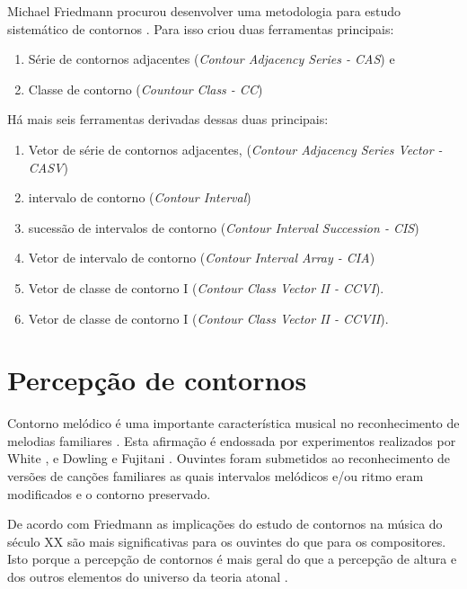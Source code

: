\documentclass[12pt,brazil]{book}
\newcommand{\eng}[1]{\textit{#1}}
\begin{document}
Michael Friedmann procurou desenvolver uma metodologia para estudo
sistemático de contornos \cite{friedmann85:methodology}. Para isso
criou duas ferramentas principais:

\begin{enumerate}
\item Série de contornos adjacentes (\eng{Contour Adjacency Series -
    CAS}) e
\item Classe de contorno (\eng{Countour Class - CC})
\end{enumerate}

Há mais seis ferramentas derivadas dessas duas principais:

\begin{enumerate}
\item Vetor de série de contornos adjacentes, (\eng{Contour Adjacency
    Series Vector - CASV})
\item intervalo de contorno (\eng{Contour Interval})
\item sucessão de intervalos de contorno (\eng{Contour Interval
    Succession - CIS})
\item Vetor de intervalo de contorno (\eng{Contour Interval Array -
    CIA})
\item Vetor de classe de contorno I (\eng{Contour Class Vector II -
    CCVI}).
\item Vetor de classe de contorno I (\eng{Contour Class Vector II -
    CCVII}).
\end{enumerate}

\section{Percepção de contornos}
\label{sec:perc-de-cont}

Contorno melódico é uma importante característica musical no
reconhecimento de melodias familiares
\cite[p. 136]{dowling.ea86:music}. Esta afirmação é endossada por
experimentos realizados por White \cite{white60:recognition}, e
Dowling e Fujitani \cite{dowling.ea71:contour}. Ouvintes foram
submetidos ao reconhecimento de versões de canções familiares as quais
intervalos melódicos e/ou ritmo eram modificados e o contorno
preservado.

De acordo com Friedmann as implicações do estudo de contornos na
música do século XX são mais significativas para os ouvintes do que
para os compositores. Isto porque a percepção de contornos é mais
geral do que a percepção de altura e dos outros elementos do universo
da teoria atonal \cite[p. 224]{friedmann85:methodology}.
\end{document}
